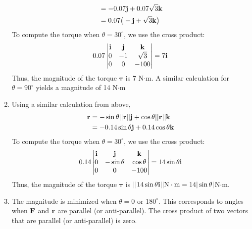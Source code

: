 \documentclass{article}
\begin{document}
\begin{enumerate}
\begin{align*}
  &= -0.07\mathbf{j} + 0.07\sqrt{3}\mathbf{k}\\
  &= 0.07\big(-\mathbf{j} + \sqrt{3}\mathbf{k}\big)
\end{align*}
To compute the torque when $\theta = 30^{\circ}$, we use the cross product:
\begin{align*}
0.07
\begin{vmatrix}
   \mathbf{i} & \mathbf{j} &  \mathbf{k} \\
   0 & -1 &  \sqrt{3} \\
   0 & 0 & -100  \\
  \end{vmatrix}=7\mathbf{i}
\end{align*} 
Thus, the magnitude of the torque $\boldsymbol\tau$ is 7 N$\cdot$m. A similar calculation for $\theta = 90^{\circ}$ yields a magnitude of 14 N$\cdot$m
\item Using a similar calculation from above, 
\begin{align*}
  \mathbf{r} &=- \sin\theta||\mathbf{r}||\mathbf{j} + \cos\theta||\mathbf{r}||\mathbf{k}\\
  &= -0.14\sin\theta\mathbf{j} + 0.14\cos\theta\mathbf{k}
\end{align*}
To compute the torque when $\theta = 30^{\circ}$, we use the cross product:
\begin{align*}
0.14
\begin{vmatrix}
   \mathbf{i} & \mathbf{j} &  \mathbf{k} \\
   0 & -\sin\theta &  \cos\theta \\
   0 & 0 & -100  \\
  \end{vmatrix}=14\sin\theta\mathbf{i}
\end{align*} 
Thus, the magnitude of the torque $\boldsymbol\tau$ is $|| 14\sin\theta\mathbf{i} || \text{N}\cdot\text{m} = 14 |\sin\theta|$N$\cdot$m.
\item The magnitude is minimized when $\theta = 0$ or $180^{\circ}$. This corresponds to angles when $\mathbf{F}$ and $\mathbf{r}$ are parallel (or anti-parallel). The cross product of two vectors that are parallel (or anti-parallel) is zero.  
\EEN


\end{enumerate}
\end{document}
